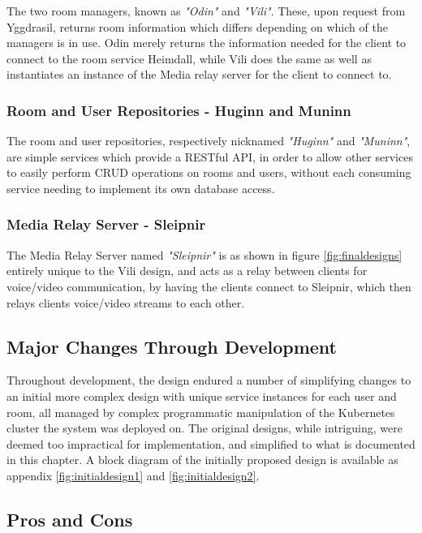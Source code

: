 The two room managers, known as \textit{"Odin"} and \textit{"Vili"}. These, upon request from Yggdrasil, returns room information which differs depending on which of the managers is in use. Odin merely returns the information needed for the client to connect to the room service Heimdall, while Vili does the same as well as instantiates an instance of the Media relay server for the client to connect to.

\subsubsection{Room and User Repositories - Huginn and Muninn}

The room and user repositories, respectively nicknamed \textit{"Huginn"} and \textit{"Muninn"}, are simple services which provide a RESTful API, in order to allow other services to easily perform CRUD operations on rooms and users, without each consuming service needing to implement its own database access.

\subsubsection{Media Relay Server - Sleipnir}

The Media Relay Server named \textit{"Sleipnir"} is as shown in figure \ref{fig:finaldesigns} entirely unique to the Vili design, and acts as a relay between clients for voice/video communication, by having the clients connect to Sleipnir, which then relays clients voice/video streams to each other.

\subsection{Major Changes Through Development}

Throughout development, the design endured a number of simplifying changes to an initial more complex design with unique service instances for each user and room, all managed by complex programmatic manipulation of the Kubernetes cluster the system was deployed on. The original designs, while intriguing, were deemed too impractical for implementation, and simplified to what is documented in this chapter. A block diagram of the initially proposed design is available as appendix \ref{fig:initialdesign1} and \ref{fig:initialdesign2}.

\subsection{Pros and Cons}

